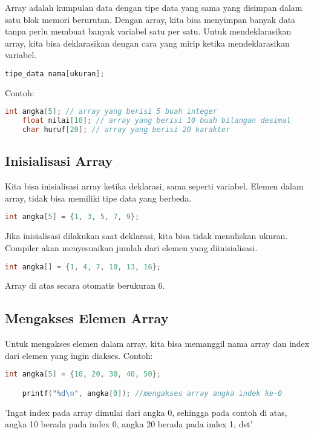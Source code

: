 Array adalah kumpulan data dengan tipe data yang sama yang disimpan dalam satu blok memori berurutan.
Dengan array, kita bisa menyimpan banyak data tanpa perlu membuat banyak variabel satu per satu.
Untuk mendeklarasikan array, kita bisa deklarasikan dengan cara yang mirip ketika mendeklarasikan variabel.
{
\captionsetup[lstlisting]{labelformat=empty, justification=raggedright, singlelinecheck=false} %
\begin{lstlisting}[language=c, caption={syntax}]
	tipe_data nama[ukuran];
\end{lstlisting}
}
Contoh:
\begin{lstlisting}[language=c]
	int angka[5]; // array yang berisi 5 buah integer
	float nilai[10]; // array yang berisi 10 buah bilangan desimal
	char huruf[20]; // array yang berisi 20 karakter
\end{lstlisting}

\subsection{Inisialisasi Array}

Kita bisa inisialisasi array ketika deklarasi, sama seperti variabel.
Elemen dalam array, tidak bisa memiliki tipe data yang berbeda.
\begin{lstlisting}[language=c]
	int angka[5] = {1, 3, 5, 7, 9};
\end{lstlisting}
Jika inisialisasi dilakukan saat deklarasi, kita bisa tidak menuliskan ukuran.
Compiler akan menyesuaikan jumlah dari elemen yang diinisialisasi.
\begin{lstlisting}[language=c]
	int angka[] = {1, 4, 7, 10, 13, 16};
\end{lstlisting}
Array di atas secara otomatis berukuran 6.

\subsection{Mengakses Elemen Array}

Untuk mengakses elemen dalam array, kita bisa memanggil nama array dan index dari elemen yang ingin diakses.
Contoh:
\begin{lstlisting}[language=c]
	int angka[5] = {10, 20, 30, 40, 50};

	printf("%d\n", angka[0]); //mengakses array angka indek ke-0
\end{lstlisting}
'Ingat index pada array dimulai dari angka 0, sehingga pada contoh di atas, angka 10 berada pada index 0, angka 20 berada pada index 1, dst'

